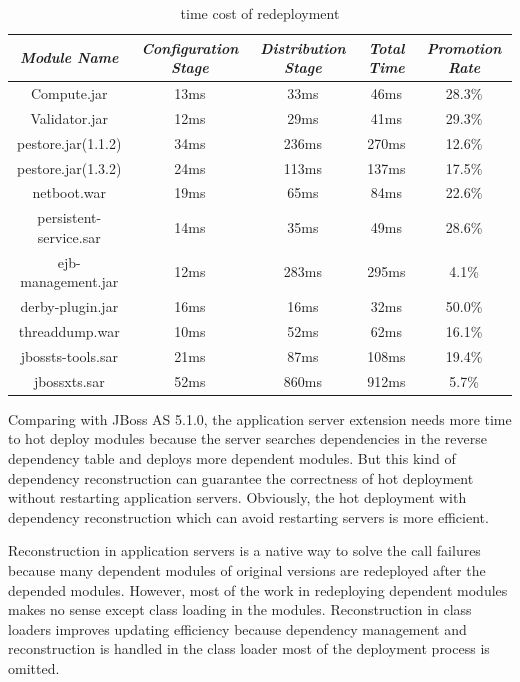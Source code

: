 \documentclass[conference]{IEEEtran}
\begin{document}
\begin{table}
\centering
\caption{time cost of redeployment}
\label{tab:stage}
\begin{tabular}{|c|c|c|c|c|}
\hline
\emph{Module Name}	&	\emph{Configuration Stage}	&	\emph{Distribution Stage}	&	\emph{Total Time}	&	\emph{Promotion Rate}\\
\hline
\hline
Compute.jar		&	13ms			&	33ms			&	46ms			&	28.3\%\\
\hline
Validator.jar		&	12ms			&	29ms			&	41ms			&	29.3\%\\
\hline
pestore.jar(1.1.2)	&	34ms			&	236ms			&	270ms			&	12.6\%\\
\hline
pestore.jar(1.3.2)	&	24ms			&	113ms			&	137ms			&	17.5\%\\
\hline
netboot.war		&	19ms		 	&	65ms			&	84ms			&	22.6\%\\
\hline
persistent-service.sar 	& 	14ms 			&	35ms			&	49ms			&	28.6\%\\
\hline
ejb-management.jar	& 	12ms		 	&	283ms			&	295ms			&	4.1\%\\
\hline
derby-plugin.jar	&	16ms			&	16ms			&	32ms			&	50.0\%\\
\hline
threaddump.war		&	10ms			&	52ms			&	62ms			&	16.1\%\\
\hline
jbossts-tools.sar	&	21ms			&	87ms			&	108ms			&	19.4\%\\
\hline
jbossxts.sar		&	52ms			&	860ms			&	912ms			&	5.7\%\\
\hline
\end{tabular}
\end{table}

Comparing with JBoss AS 5.1.0, the application server extension needs more time to hot deploy modules because the server searches dependencies in the reverse dependency table and deploys more dependent modules.
But this kind of dependency reconstruction can guarantee the correctness of hot deployment without restarting application servers.
Obviously, the hot deployment with dependency reconstruction which can avoid restarting servers is more efficient.

Reconstruction in application servers is a native way to solve the call failures because many dependent modules of original versions are redeployed after the depended modules.
However, most of the work in redeploying dependent modules makes no sense except class loading in the modules.
Reconstruction in class loaders improves updating efficiency because dependency management and reconstruction is handled in the class loader most of the deployment process is omitted.
\end{document}

